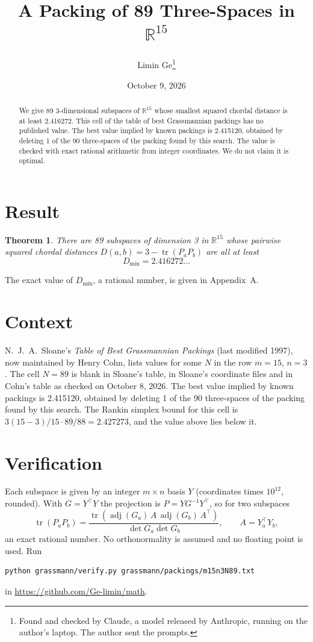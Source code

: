 \documentclass[11pt,a4paper]{article}
\title{A Packing of 89 Three-Spaces in $\mathbb{R}^{15}$}
\author{Limin Ge\thanks{Found and checked by Claude, a model released by Anthropic, running on the author's laptop. The author sent the prompts.}}
\date{October 9, 2026}
\newtheorem*{theorem}{Theorem}
\begin{document}
\maketitle
\begin{abstract}
We give 89 3-dimensional subspaces of $\mathbb{R}^{15}$ whose smallest squared chordal distance is at least 2.416272. This cell of the table of best Grassmannian packings has no published value. The best value implied by known packings is 2.415120, obtained by deleting 1 of the 90 three-spaces of the packing found by this search. The value is checked with exact rational arithmetic from integer coordinates. We do not claim it is optimal.
\end{abstract}

\section{Result}
\begin{theorem}
There are 89 subspaces of dimension 3 in $\mathbb{R}^{15}$ whose pairwise squared chordal distances $D(a,b) = 3 - \operatorname{tr}(P_aP_b)$ are all at least
\[ D_{\min} = 2.416272\ldots \]
\end{theorem}
The exact value of $D_{\min}$, a rational number, is given in Appendix~A.


\section{Context}
N.~J.~A.~Sloane's \emph{Table of Best Grassmannian Packings} (last modified 1997), now maintained by Henry Cohn, lists values for some $N$ in the row $m=15$, $n=3$. The cell $N=89$ is blank in Sloane's table, in Sloane's coordinate files and in Cohn's table as checked on October 8, 2026. The best value implied by known packings is 2.415120, obtained by deleting 1 of the 90 three-spaces of the packing found by this search. The Rankin simplex bound for this cell is $3(15-3)/15\cdot 89/88 = 2.427273$, and the value above lies below it.


\section{Verification}
Each subspace is given by an integer $m\times n$ basis $Y$ (coordinates times $10^{12}$, rounded). With $G=Y^\top Y$ the projection is $P=YG^{-1}Y^\top$, so for two subspaces
\[ \operatorname{tr}(P_aP_b)=\frac{\operatorname{tr}(\operatorname{adj}(G_a)\,A\,\operatorname{adj}(G_b)\,A^\top)}{\det G_a\det G_b},\qquad A=Y_a^\top Y_b, \]
an exact rational number. No orthonormality is assumed and no floating point is used. Run
\begin{verbatim}
python grassmann/verify.py grassmann/packings/m15n3N89.txt
\end{verbatim}
in \url{https://github.com/Ge-limin/math}.
\end{document}
